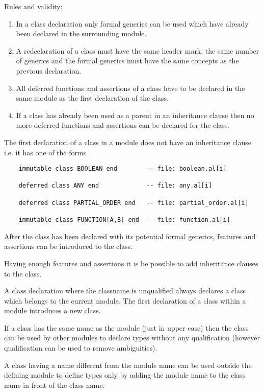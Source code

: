 \noindent Rules and validity:
\begin{enumerate}
\item In a class declaration only formal generics can be used which have
  already been declared in the surrounding module.

\item A redeclaration of a class must have the same header mark, the same
  number of generics and the formal generics must have the same concepts as
  the previous declaration.

\item All deferred functions and assertions of a class have to be declared in
  the same module as the first declaration of the class.

\item If a class has already been used as a parent in an inheritance clause
  then no more deferred functions and assertions can be declared for the class.
\end{enumerate}

The first declaration of a class in a module does not have an inheritance
clause i.e. it has one of the forms

\begin{lstlisting}
    immutable class BOOLEAN end        -- file: boolean.al[i]

    deferred class ANY end             -- file: any.al[i]

    deferred class PARTIAL_ORDER end   -- file: partial_order.al[i]

    immutable class FUNCTION[A,B] end  -- file: function.al[i]
\end{lstlisting}
After the class has been declared with its potential formal generics, features
and assertions can be introduced to the class.

Having enough features and assertions it is be possible to add inheritance
clauses to the class.

A class declaration where the classname is unqualified always declares a class
which belongs to the current module. The first declaration of a class within a
module introduces a new class.

If a class has the same name as the module (just in upper case) then the class
can be used by other modules to declare types without any qualification
(however qualification can be used to remove ambiguities).

A class having a name different from the module name can be used outside the
defining module to define types only by adding the module name to the class
name in front of the class name.

